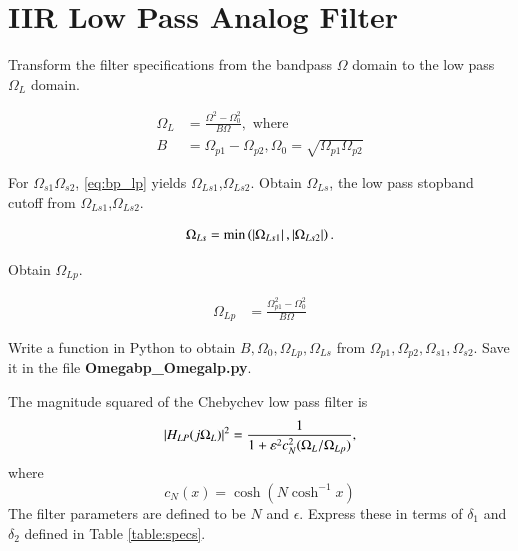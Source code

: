 \documentclass[journal,12pt,twocolumn]{IEEEtran}
\begin{document}
\section{IIR Low Pass Analog Filter}
\begin{problem}
Transform the filter specifications from the bandpass $\Omega$ domain to the low pass $\Omega_L$ domain.
\end{problem}
\solution
\begin{align}
\label{eq:bp_lp}
\Omega_L &= \frac{\Omega^2-\Omega_0^2}{B\Omega}, \text { where }
\\
B &= \Omega_{p1}-\Omega_{p2}, \Omega_0 = \sqrt{\Omega_{p1}\Omega_{p2}}
\end{align}
\begin{problem}
For $\Omega_{s1}\Omega_{s2}$, \eqref{eq:bp_lp} yields $\Omega_{Ls1}$,$\Omega_{Ls2}$.  Obtain $\Omega_{Ls}$, the low pass stopband cutoff from $\Omega_{Ls1}$,$\Omega_{Ls2}$.
\end{problem}
\solution
\begin{align}
\Omega_{Ls} = \min\left(\left\vert\Omega_{Ls1}\right\vert,\left\vert\Omega_{Ls2}\right\vert\right).
\end{align}
\begin{problem}
Obtain $\Omega_{Lp}$.
\end{problem}
\solution
\begin{align}
\label{eq:bp_lp}
\Omega_{Lp} &= \frac{\Omega_{p1}^2-\Omega_0^2}{B\Omega}
\end{align}
\begin{problem}
Write a function in Python to obtain $B,\Omega_0,\Omega_{Lp},\Omega_{Ls}$ from $\Omega_{p1},\Omega_{p2},\Omega_{s1},\Omega_{s2}$. Save it in the file \textbf{Omegabp\_Omegalp.py}.
\end{problem}
\solution

\begin{problem}
The magnitude squared of the Chebychev low pass filter is 
\begin{equation}
\left\vert H_{LP}(j\Omega_L)\right\vert^2 = \frac{1}{1+\varepsilon^{2}c_N^2(\Omega_L/\Omega_{Lp})},
\end{equation}
%
where
\begin{equation}
c_N(x) = \cosh(N\cosh^{-1}x)
\end{equation}
The filter parameters are defined to be $N$ and $\epsilon$.  Express these in terms of $\delta_1$ and $\delta_2$ defined in Table \ref{table:specs}.
\end{problem}
\end{document}
